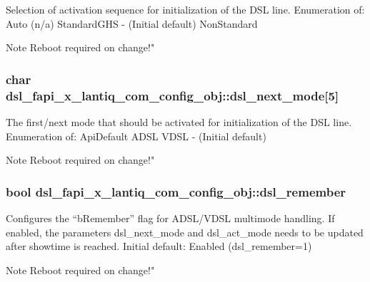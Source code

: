 Selection of activation sequence for initialization of the D\-S\-L line. Enumeration of\-: Auto (n/a) Standard\-G\-H\-S -\/ (Initial default) Non\-Standard \begin{DoxyNote}{Note}
Reboot required on change!" 
\end{DoxyNote}
\hypertarget{structdsl__fapi__x__lantiq__com__config__obj_acad157690b955ff9c979e801c4671dac}{
\subsubsection[{dsl\-\_\-next\-\_\-mode}]{\setlength{\rightskip}{0pt plus 5cm}char dsl\-\_\-fapi\-\_\-x\-\_\-lantiq\-\_\-com\-\_\-config\-\_\-obj\-::dsl\-\_\-next\-\_\-mode\mbox{[}5\mbox{]}}}\label{structdsl__fapi__x__lantiq__com__config__obj_acad157690b955ff9c979e801c4671dac}
The first/next mode that should be activated for initialization of the D\-S\-L line. Enumeration of\-: Api\-Default A\-D\-S\-L V\-D\-S\-L -\/ (Initial default) \begin{DoxyNote}{Note}
Reboot required on change!" 
\end{DoxyNote}
\hypertarget{structdsl__fapi__x__lantiq__com__config__obj_af6abdd1483004c76b760edeb26586626}{
\subsubsection[{dsl\-\_\-remember}]{\setlength{\rightskip}{0pt plus 5cm}bool dsl\-\_\-fapi\-\_\-x\-\_\-lantiq\-\_\-com\-\_\-config\-\_\-obj\-::dsl\-\_\-remember}}\label{structdsl__fapi__x__lantiq__com__config__obj_af6abdd1483004c76b760edeb26586626}
Configures the “b\-Remember” flag for A\-D\-S\-L/\-V\-D\-S\-L multimode handling. If enabled, the parameters dsl\-\_\-next\-\_\-mode and dsl\-\_\-act\-\_\-mode needs to be updated after showtime is reached. Initial default\-: Enabled (dsl\-\_\-remember=1) \begin{DoxyNote}{Note}
Reboot required on change!" 
\end{DoxyNote}
